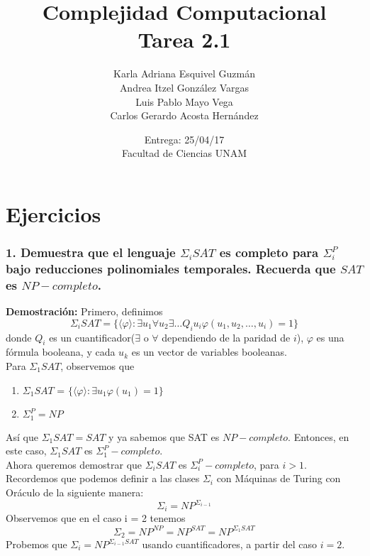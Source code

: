 \documentclass[12pt]{article}
\title{Complejidad Computacional \\ Tarea 2.1}
\author{Karla Adriana Esquivel Guzmán \\ Andrea Itzel González Vargas\\ Luis Pablo Mayo Vega \\ Carlos Gerardo Acosta Hernández}
\date{Entrega: 25/04/17 \\ Facultad de Ciencias UNAM}
\begin{document}
\maketitle
\section*{Ejercicios}
\subsubsection*{1. Demuestra que el lenguaje $\Sigma _iSAT$ es completo para $\Sigma ^P_i$ bajo reducciones polinomiales
temporales. Recuerda que $SAT$ es $NP-completo$.}
\textbf{Demostración:}
Primero, definimos  
\begin{equation*} \label{eq:1}
 \Sigma _{i}SAT = \{ \langle \varphi \rangle : \exists u_1 \forall u_2 \exists \dots Q_{i}u_{i}\varphi(u_1,u_2,\dots,u_{i}) = 1 \}
\end{equation*}
donde $Q_{i}$ es un cuantificador($\exists$ o $\forall$ dependiendo de la paridad de $i$), $\varphi$ es una fórmula booleana, y cada $u_k$ es un vector de variables booleanas.\\

Para $\Sigma_1SAT$, observemos que
\begin{enumerate}
\item $\Sigma_1SAT$ = $\{ \langle \varphi \rangle : \exists u_1 \varphi(u_1) = 1 \}$ 
\item $\Sigma^P_1 = NP$
\end{enumerate}
Así que $\Sigma _1SAT = SAT$ y ya sabemos que SAT es $NP-completo$. Entonces, en este caso, $\Sigma_1SAT$ es $\Sigma^P_1-completo$. \\

Ahora queremos demostrar que $\Sigma _{i}SAT$ es $\Sigma^P_{i}-completo$, para $i > 1$.\\
Recordemos que podemos definir a las clases $\Sigma_i$ con Máquinas de Turing con Oráculo de la siguiente manera: \\
\begin{equation*}
\Sigma_i = NP^{\Sigma_{i-1}}
\end{equation*} 
Observemos que en el caso i = 2 tenemos \\
\begin{equation*}
\Sigma_2 = NP^{NP} = NP^{SAT} = NP^{\Sigma_1SAT}
\end{equation*}
Probemos que $\Sigma_i = NP^{\Sigma_{i-1}SAT}$ usando cuantificadores, a partir del caso $i=2$.\\
\end{document}
